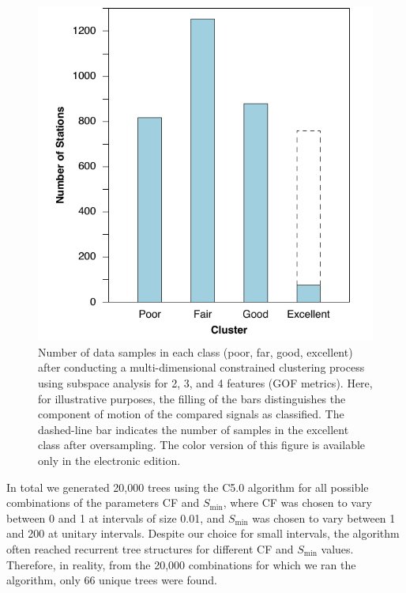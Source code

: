\begin{figure}[t]
	\centering
	\includegraphics[width=\columnwidth]{figures/pdf/figure-07}
	\caption{Number of data samples in each class (poor, far, good, excellent) after conducting a multi-dimensional constrained \kmeans{} clustering process using subspace analysis for 2, 3, and 4 features (GOF metrics). Here, for illustrative purposes, the filling of the bars distinguishes the component of motion of the compared signals as classified. The dashed-line bar indicates the number of samples in the excellent class after oversampling. The color version of this figure is available only in the electronic edition.}
	\label{fig:count-classes}
\end{figure}

In total we generated 20,000 trees using the C5.0 algorithm for all possible combinations of the parameters CF and $S_{\min}$, where CF was chosen to vary between 0 and 1 at intervals of size 0.01, and $S_{\min}$ was chosen to vary between 1 and 200 at unitary intervals. Despite our choice for small intervals, the algorithm often reached recurrent tree structures for different CF and $S_{\min}$ values. Therefore, in reality, from the 20,000 combinations for which we ran the algorithm, only 66 unique trees were found. 

